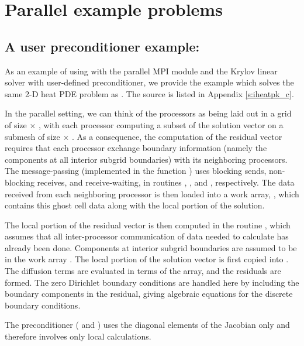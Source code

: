 \section{Parallel example problems}\label{s:ex_parallel}

\subsection{A user preconditioner example: }\label{ss:iheatpk}

As an example of using {\ida} with the parallel MPI {\nvecp} module and the Krylov 
linear solver {\idaspgmr} with user-defined preconditioner, we provide the example
 which solves the same 2-D heat PDE problem as . 
The source is listed in Appendix \ref{s:iheatpk_c}.

In the parallel setting, we can think of the processors as being laid out
in a grid of size  $\times$ , with each processor computing
a subset of the solution vector on a submesh of size  $\times$
.  As a consequence, the computation of the residual
vector requires that each processor exchange boundary information
(namely the components at all interior subgrid boundaries) with its
neighboring processors.  The message-passing (implemented in the
function ) uses blocking sends, non-blocking receives, and
receive-waiting, in routines , , and
, respectively.  The data received from each neighboring
processor is then loaded into a work array, , which contains
this ghost cell data along with the local portion of the solution.

The local portion of the residual vector is then computed in the
routine , which assumes that all inter-processor
communication of data needed to calculate  has already been
done.  Components at interior subgrid boundaries are assumed to be in
the work array .  The local portion of the solution vector
 is first copied into .  The diffusion terms are
evaluated in terms of the  array, and the residuals are
formed.  The zero Dirichlet boundary conditions are handled here by
including the boundary components in the residual, giving algebraic
equations for the discrete boundary conditions.

The preconditioner ( and ) uses the diagonal 
elements of the Jacobian only and therefore involves only local calculations.

